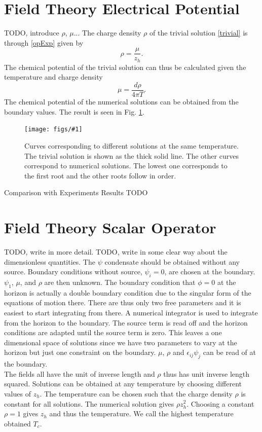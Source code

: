 \documentclass[12pt]{report}
\newcommand{\At}{\ensuremath{{\phi}}}
\newcommand{\fig}[3]{
\begin{figure}
\centering
\texttt{[image: figs/\#1]}
\caption{#2}
\end{figure}
}
\begin{document}
\section{Field Theory Electrical Potential}
TODO, introduce $\rho$, $\mu$...
The charge density $\rho$ of the trivial solution \eqref{trivial} is through \eqref{opExp} given by
\begin{equation}
 \rho=\frac{\mu}{z_h}.
\end{equation}
The chemical potential of the trivial solution can thus be calculated given the temperature and charge density
\begin{equation}
 \mu=\frac{d\rho}{4\pi T}.
\end{equation}
The chemical potential of the numerical solutions can be obtained from the boundary values. The result is seen in Fig. \ref{f:mu}.

\fig{muTzeros}{Curves corresponding to different solutions at the same temperature. The trivial solution is shown as the thick solid line. The other curves correspond to numerical solutions. The lowest one corresponds to the first root and the other roots follow in order.\label{f:mu}}
\subsection{Comparison with Experiments Results}
TODO
\section{Field Theory Scalar Operator}
TODO, write in more detail. TODO, write in some clear way about the dimensionless quantities.
The $\psi$ condensate should be obtained without any source. Boundary conditions without source, $\psi_i=0$, are chosen at the boundary. $\psi_1$, $\mu$, and $\rho$ are then unknown. The boundary condition that $\At=0$ at the horizon is actually a double boundary condition due to the singular form of the equations of motion there. There are thus only two free parameters and it is easiest to start integrating from there. A numerical integrator is used to integrate from the horizon to the boundary. The source term is read off and the horizon conditions are adapted until the source term is zero. This leaves a one dimensional space of solutions since we have two parameters to vary at the horizon but just one constraint on the boundary. $\mu$, $\rho$ and $\epsilon_{ij}\psi_j$ can be read of at the boundary.\\

The fields all have the unit of inverse length and $\rho$ thus has unit inverse length squared. Solutions can be obtained at any temperature by choosing different values of $z_h$. The temperature can be chosen such that the charge density $\rho$ is constant for all solutions. The numerical solution gives $\rho z_h^2$. Choosing a constant $\rho=1$ gives $z_h$ and thus the temperature. We call the highest temperature obtained $T_c$.
\end{document}
